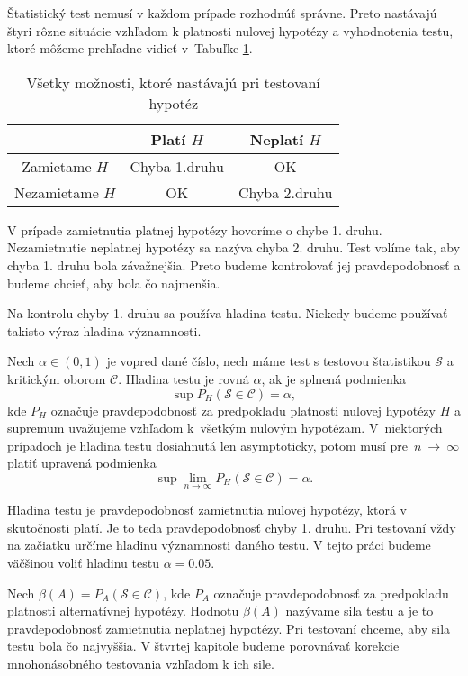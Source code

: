 Štatistický test nemusí v každom prípade rozhodnúť správne. 
Preto nastávajú štyri rôzne situácie vzhľadom k platnosti nulovej hypotézy a vyhodnotenia testu, 
ktoré môžeme prehľadne vidieť v~Tabuľke \ref{tab01:1}. 

\begin{table}[h!]
  \centering
  \begin{tabular}{|c|c|c|}
    \hline
     & Platí $H$ & Neplatí $H$ \\ \hline
    Zamietame $H$ & Chyba 1.druhu & OK \\ \hline
    Nezamietame $H$ & OK & Chyba 2.druhu \\ \hline
  \end{tabular}
  \caption{Všetky možnosti, ktoré nastávajú pri testovaní hypotéz}
  \captionsetup{justification=centering}
  \label{tab01:1}
\end{table}

V prípade zamietnutia platnej hypotézy hovoríme o chybe 1. druhu. 
Nezamietnutie neplatnej hypotézy sa nazýva chyba 2. druhu. 
Test volíme tak, aby chyba 1. druhu bola závažnejšia. 
Preto budeme kontrolovať jej pravdepodobnosť a budeme chcieť, aby bola čo najmenšia.

Na kontrolu chyby 1. druhu sa používa hladina testu. Niekedy budeme používať takisto výraz hladina významnosti. 

\begin{definicia}\label{def3}
  Nech $\alpha \in (0,1)$ je vopred dané číslo, nech máme test s testovou štatistikou $\mathcal{S}$ a kritickým oborom $\mathcal{C}$. 
  Hladina testu je rovná $\alpha$, ak je splnená podmienka $$ \sup P_H (\mathcal{S} \in \mathcal{C}) = \alpha, $$
  kde $P_H$ označuje pravdepodobnosť za predpokladu platnosti nulovej hypotézy $H$ 
  a supremum uvažujeme vzhľadom k~všetkým nulovým hypotézam. 
  V~niektorých prípadoch je hladina testu dosiahnutá len asymptoticky, potom musí pre~$n~\longrightarrow~\infty$ platiť upravená podmienka 
  $$ \sup \lim_{n \rightarrow \infty} P_H (\mathcal{S} \in \mathcal{C}) = \alpha. $$
\end{definicia}  

Hladina testu je pravdepodobnosť zamietnutia nulovej hypotézy, ktorá v skutočnosti platí. 
Je to teda pravdepodobnosť chyby 1. druhu. 
Pri testovaní vždy na začiatku určíme hladinu významnosti daného testu. 
V tejto práci budeme väčšinou voliť hladinu testu $\alpha=0.05$. 

Nech $\beta (A) = P_A (\mathcal{S} \in \mathcal{C})$, 
kde $P_A$ označuje pravdepodobnosť za predpokladu platnosti alternatívnej hypotézy. 
Hodnotu $\beta (A)$ nazývame sila testu a je to pravdepodobnosť zamietnutia neplatnej hypotézy. 
Pri testovaní chceme, aby sila testu bola čo najvyššia. 
V štvrtej kapitole budeme porovnávať korekcie mnohonásobného testovania vzhľadom k ich sile. 

